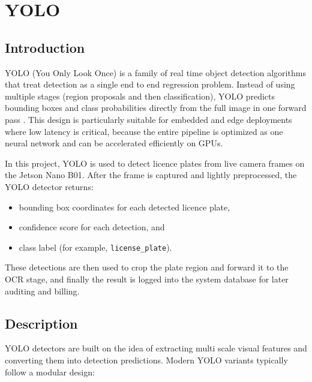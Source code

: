 %
%
%
\newpage
\section{YOLO}

\subsection{Introduction}

\noindent
YOLO (You Only Look Once) is a family of real time object detection algorithms that treat detection as a single end to end regression problem. Instead of using multiple stages (region proposals and then classification), YOLO predicts bounding boxes and class probabilities directly from the full image in one forward pass \cite{redmon2016yolo,redmon2016yolo_arxiv}. This design is particularly suitable for embedded and edge deployments where low latency is critical, because the entire pipeline is optimized as one neural network and can be accelerated efficiently on GPUs.

In this project, YOLO is used to detect licence plates from live camera frames on the Jetson Nano B01. After the frame is captured and lightly preprocessed, the YOLO detector returns:
\begin{itemize}
	\item bounding box coordinates for each detected licence plate,
	\item confidence score for each detection, and
	\item class label (for example, \texttt{license\_plate}).
\end{itemize}
These detections are then used to crop the plate region and forward it to the OCR stage, and finally the result is logged into the system database for later auditing and billing.

\subsection{Description}

YOLO detectors are built on the idea of extracting multi scale visual features and converting them into detection predictions. Modern YOLO variants typically follow a modular design:

